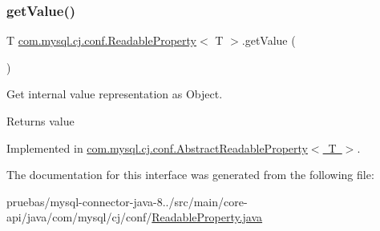 \mbox{\label{interfacecom_1_1mysql_1_1cj_1_1conf_1_1_readable_property_a602dfa3dbe87560a5ceca17a38f30844}} 
\subsubsection{\texorpdfstring{get\+Value()}{getValue()}}
{\footnotesize\ttfamily T \mbox{\hyperlink{interfacecom_1_1mysql_1_1cj_1_1conf_1_1_readable_property}{com.\+mysql.\+cj.\+conf.\+Readable\+Property}}$<$ T $>$.get\+Value (\begin{DoxyParamCaption}{ }\end{DoxyParamCaption})}

Get internal value representation as Object.

\begin{DoxyReturn}{Returns}
value 
\end{DoxyReturn}


Implemented in \mbox{\hyperlink{classcom_1_1mysql_1_1cj_1_1conf_1_1_abstract_readable_property_abb381de77253efc91da51b518f28ed42}{com.\+mysql.\+cj.\+conf.\+Abstract\+Readable\+Property$<$ T $>$}}.



The documentation for this interface was generated from the following file\+:\begin{DoxyCompactItemize}
\item 
pruebas/mysql-\/connector-\/java-\/8../src/main/core-\/api/java/com/mysql/cj/conf/\mbox{\hyperlink{_readable_property_8java}{Readable\+Property.\+java}}\end{DoxyCompactItemize}
